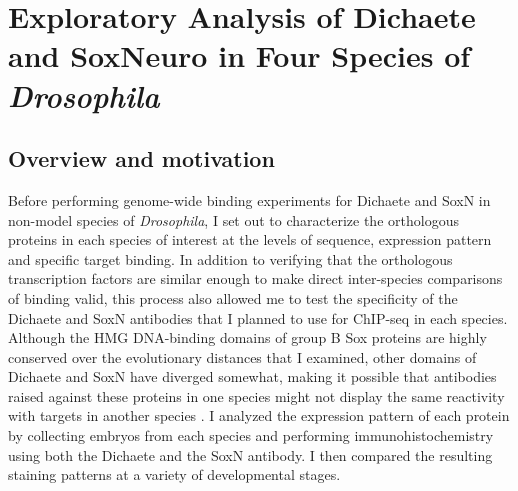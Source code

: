 \chapter{Exploratory Analysis of Dichaete and SoxNeuro in Four Species of \emph{Drosophila}}

\hrulefill

\section{Overview and motivation}

Before performing genome-wide binding experiments for Dichaete and SoxN in non-model species of \emph{Drosophila}, I set out to characterize the orthologous proteins in each species of interest at the levels of sequence, expression pattern and specific target binding. In addition to verifying that the orthologous transcription factors are similar enough to make direct inter-species comparisons of binding valid, this process also allowed me to test the specificity of the Dichaete and SoxN antibodies that I planned to use for ChIP-seq in each species. Although the HMG DNA-binding domains of group B Sox proteins are highly conserved over the evolutionary distances that I examined, other domains of Dichaete and SoxN have diverged somewhat, making it possible that antibodies raised against these proteins in one species might not display the same reactivity with targets in another species \citep{mckimmie_conserved_2005}. I analyzed the expression pattern of each protein by collecting embryos from each species and performing immunohistochemistry using both the Dichaete and the SoxN antibody. I then compared the resulting staining patterns at a variety of developmental stages.\\

